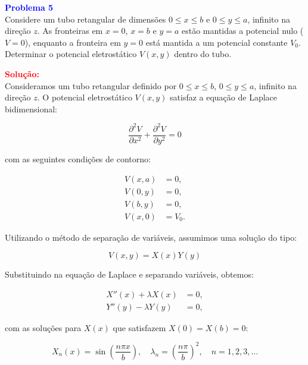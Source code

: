 \documentclass[a4paper,12pt]{article}
\begin{document}
\begin{flushleft}
\textbf{\textcolor{blue}{\Large Problema 5}}\\

Considere um tubo retangular de dimensões \( 0 \leq x \leq b \) e \( 0 \leq y \leq a \), infinito na direção \( z \).  
As fronteiras em \( x = 0 \), \( x = b \) e \( y = a \) estão mantidas a potencial nulo (\( V = 0 \)), enquanto  
a fronteira em \( y = 0 \) está mantida a um potencial constante \( V_0 \).  
Determinar o potencial eletrostático \( V(x, y) \) dentro do tubo.

\textcolor{red}{\textbf{Solução:}}\\


Consideramos um tubo retangular definido por \( 0 \leq x \leq b \), \( 0 \leq y \leq a \), infinito na direção \( z \). O potencial eletrostático \( V(x, y) \) satisfaz a equação de Laplace bidimensional:

\begin{equation}
\frac{\partial^2 V}{\partial x^2} + \frac{\partial^2 V}{\partial y^2} = 0
\end{equation}

com as seguintes condições de contorno:

\begin{align*}
V(x, a) &= 0, \\
V(0, y) &= 0, \\
V(b, y) &= 0, \\
V(x, 0) &= V_0.
\end{align*}

Utilizando o \colorbox{yellow!25}{método de separação de variáveis}, assumimos uma solução do tipo:

\begin{equation}
V(x, y) = X(x)Y(y)
\end{equation}

Substituindo na equação de Laplace e separando variáveis, obtemos:

\begin{align*}
X''(x) + \lambda X(x) &= 0, \\
Y''(y) - \lambda Y(y) &= 0,
\end{align*}

com as soluções para \( X(x) \) que satisfazem \( X(0) = X(b) = 0 \):

\begin{equation}
X_n(x) = \sin\left( \frac{n\pi x}{b} \right), \quad \lambda_n = \left( \frac{n\pi}{b} \right)^2, \quad n = 1, 2, 3, \ldots
\end{equation}


\end{flushleft}
\end{document}
